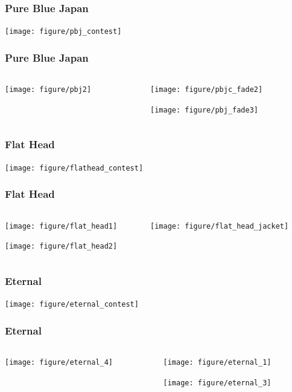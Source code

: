 \documentclass{beamer}
\begin{document}
\begin{frame}
  \frametitle{Pure Blue Japan}
  \texttt{[image: figure/pbj\_contest]}
\end{frame}

\begin{frame}
  \frametitle{Pure Blue Japan}
  \begin{columns}
    \begin{column}{0.5\textwidth}
      \texttt{[image: figure/pbj2]}
    \end{column}
    \begin{column}{0.5\textwidth}
      \texttt{[image: figure/pbjc\_fade2]}

      \texttt{[image: figure/pbj\_fade3]}
    \end{column}
  \end{columns}
\end{frame}

\begin{frame}
  \frametitle{Flat Head}
  \texttt{[image: figure/flathead\_contest]}
\end{frame}

\begin{frame}
  \frametitle{Flat Head}
  \begin{columns}
    \begin{column}{0.5\textwidth}
      \texttt{[image: figure/flat\_head1]}

      \texttt{[image: figure/flat\_head2]}
    \end{column}
    \begin{column}{0.5\textwidth}
      \texttt{[image: figure/flat\_head\_jacket]}
    \end{column}
  \end{columns}
\end{frame}

\begin{frame}
  \frametitle{Eternal}
  \texttt{[image: figure/eternal\_contest]}
\end{frame}

\begin{frame}
  \frametitle{Eternal}
  \begin{columns}
    \begin{column}{0.5\textwidth}
      \texttt{[image: figure/eternal\_4]}
    \end{column}
    \begin{column}{0.5\textwidth}
      \texttt{[image: figure/eternal\_1]}

      \texttt{[image: figure/eternal\_3]}
    \end{column}
  \end{columns}
\end{frame}
\end{document}

